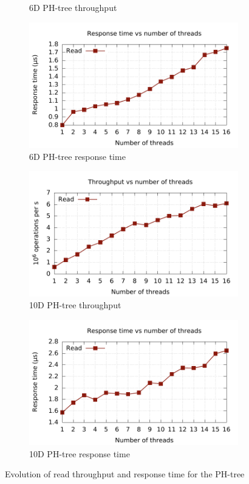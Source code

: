 \documentclass[11pt,a4paper]{globis-book}
\begin{document}
\begin{figure}
\begin{subfigure}[b]{0.5\linewidth}
        \caption{6D PH-tree throughput}
    \end{subfigure}%
    \begin{subfigure}[b]{0.5\linewidth}
        \includegraphics[scale=0.5]{images/plots/read6d-rt}
        \caption{6D PH-tree response time}
    \end{subfigure}
    \begin{subfigure}[b]{0.5\linewidth}
        \includegraphics[scale=0.5]{images/plots/read10d-tp}
        \caption{10D PH-tree throughput}
    \end{subfigure}%
    \begin{subfigure}[b]{0.5\linewidth}
        \includegraphics[scale=0.5]{images/plots/read10d-rt}
        \caption{10D PH-tree response time}
    \end{subfigure}
    \caption{Evolution of read throughput and response time for the PH-tree}
    \label{fig:concurrent-read}
\end{figure}
\end{document}
